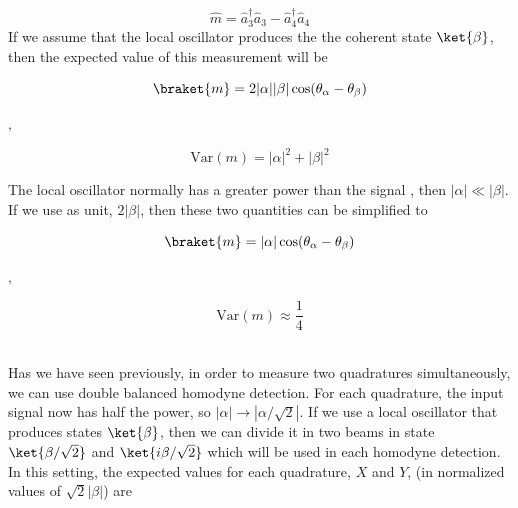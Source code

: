 %
\begin{equation}
\hat{m} = \hat{a}^\dagger_3\hat{a}_3 - \hat{a}^\dagger_4\hat{a}_4
\end{equation}
%
If we assume that the local oscillator produces the the coherent state $\ket{\beta}$, then the expected value of this measurement will be
%
\begin{center}
	\begin{minipage}{58mm}
		\noindent
		\begin{equation}
			\braket{m} = 2|\alpha||\beta|\cos({\theta_\alpha - \theta_\beta})
		\end{equation}
	\end{minipage}
	$,\quad$
	\begin{minipage}{46mm}
		\noindent
		\begin{equation}
			\textrm{Var}(m) = |\alpha|^2 + |\beta|^2
		\end{equation}
	\end{minipage}
\end{center}
%
The local oscillator normally has a greater power than the signal
, then $|\alpha| \ll |\beta|$. If we use as unit, $2|\beta|$, then these two quantities can be simplified to
%
\begin{center}
	\begin{minipage}{52mm}
		\noindent
		\begin{equation}
			\braket{m} = |\alpha|\cos({\theta_\alpha - \theta_\beta})
		\end{equation}
	\end{minipage}
	$,\quad$
	\begin{minipage}{34mm}
		\noindent
		\begin{equation}
			\textrm{Var}(m) \approx \frac{1}{4}
		\end{equation}
	\end{minipage}
\end{center}
%
\cite{hans2004}
\\
Has we have seen previously, in order to measure two quadratures simultaneously, we can use double balanced homodyne detection. For each quadrature, the input signal now has half the power, so $|\alpha| \rightarrow |\alpha/\sqrt{2}|$.  If we use a local oscillator that produces states $\ket{\beta}$, then we can divide it in two beams in state $\ket{\beta/\sqrt{2}}$ and $\ket{i\beta/\sqrt{2}}$ which will be used in each homodyne detection. In this setting, the expected values for each quadrature, $X$ and $Y$, (in normalized values of $\sqrt{2}|\beta|$) are

